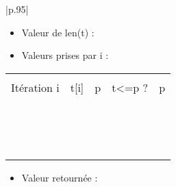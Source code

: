 \documentclass[10pt]{article}
\begin{document}
\begin{center}
\begin{tabular}{|p{.95\linewidth}|}
\hline
\begin{itemize}
\item Valeur de \textsf{len(t)} : \dotfill
\vspace{1cm}
\item Valeurs prises par \textsf{i} : \dotfill
\end{itemize} 
\begin{center}
\begin{tabular}{|p{2cm}|p{2cm}|p{2cm}|p{2cm}|p{2cm}|}
\hline 
& & & & \\
Itération \textsf{i} & \textsf{t[i]} & \textsf{p} & \textsf{t<=p} ? & p \\
& & & & \\
\hline
& & & & \\
& & & & \\
\hline
& & & & \\
& & & & \\
\hline
& & & & \\
& & & & \\
\hline
& & & & \\
& & & & \\
\hline
& & & & \\
& & & & \\
\hline
& & & & \\
& & & & \\
\hline
& & & & \\
& & & & \\
\hline
\end{tabular}
\end{center}
\begin{itemize}
\item Valeur retournée : \dotfill
\end{itemize} 
\\
\hline
\end{tabular}
\end{center}
\fi

\newpage

\subparagraph{}
\textit{}%
\end{document}
